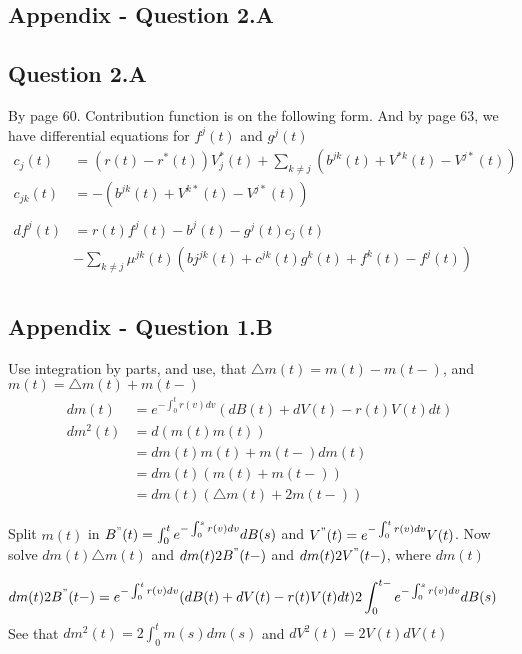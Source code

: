 \documentclass[12pt]{article}
\begin{document}
\subsection{Appendix - Question 2.A}
\subsection{Question 2.A}
By page 60. Contribution function is on the following form. And by page 63, we have differential equations for $f^j(t)$ and $g^j(t)$
\begin{equation}
\begin{split}
c_j(t) & = (r(t)-r^*(t))V_j^*(t) + \sum_{k\neq j}(b^{jk}(t)+V^{*k}(t) - V^{j*}(t)) \\
c_{jk}(t) & = -(b^{jk}(t) + V^{k*}(t) - V^{j*}(t)) \\ \\
df^j(t) & = r(t)f^j(t) - b^j(t) - g^j(t)c_j(t) 
\\ & - \sum_{k\neq j} \mu^{jk}(t) (bj^{jk}(t) + c^{jk}(t)g^k(t) + f^k(t) - f^j(t)) \\
\end{split}
\end{equation}

\subsection{Appendix - Question 1.B}
Use integration by parts, and use, that $\triangle m(t) = m(t) - m(t-)$, and $m(t) = \triangle m(t) + m(t-)$
\begin{equation}
\begin{split}
dm(t) & = e^{-\int_0^t r(v)dv}(dB(t) + dV(t) - r(t)V(t)dt) \\
dm^2(t) & = d(m(t)m(t)) \\
		& = dm(t)m(t) + m(t-)dm(t) \\
		& = dm(t)(m(t) + m(t-)) \\
		& = dm(t)(\triangle m(t) + 2 m(t-))
\end{split}
\end{equation}

Split $m(t)$ in $B^"(t) = \int_0^t e^{-\int_0^s {r(v) dv}}dB(s)$ and 
$V^"(t) = e^{-\int_0^t {r(v) dv}} V(t)$. Now solve $dm(t) \triangle m(t)$ and $dm(t) 2B^"(t-)$ and $dm(t) 2V^"(t-)$, where $dm(t)$

\begin{equation}
\begin{split}
dm(t) 2B^"(t-) & = e^{-\int_0^t r(v)dv}(dB(t) + dV(t) - r(t)V(t)dt) 2\int_0^{t-} e^{-\int_0^s {r(v) dv}}dB(s)
\end{split}
\end{equation}
See that $dm^2(t) = 2 \int_0^t m(s)dm(s)$ and $dV^2(t) = 2 V(t)dV(t)$
\end{document}
